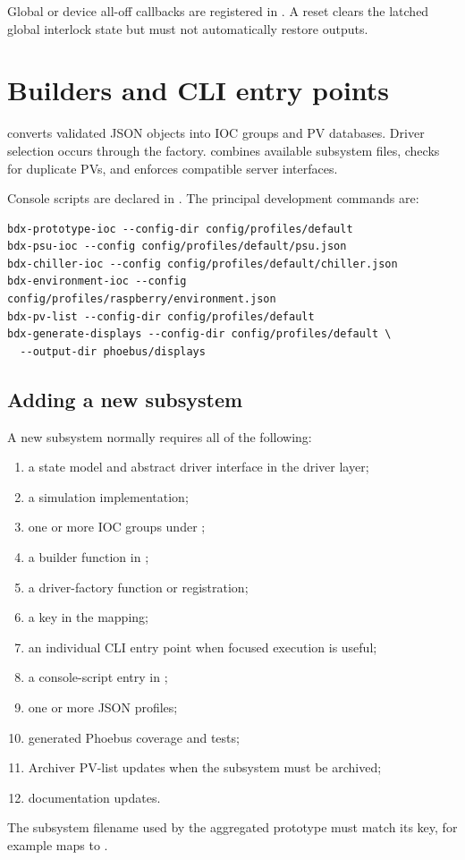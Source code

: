 Global or device all-off callbacks are registered in . A reset clears the latched global interlock state but must not automatically restore outputs.

\section{Builders and CLI entry points}

 converts validated JSON objects into IOC groups and PV databases. Driver selection occurs through the factory.  combines available subsystem files, checks for duplicate PVs, and enforces compatible server interfaces.

Console scripts are declared in . The principal development commands are:

\begin{lstlisting}[style=shell]
bdx-prototype-ioc --config-dir config/profiles/default
bdx-psu-ioc --config config/profiles/default/psu.json
bdx-chiller-ioc --config config/profiles/default/chiller.json
bdx-environment-ioc --config config/profiles/raspberry/environment.json
bdx-pv-list --config-dir config/profiles/default
bdx-generate-displays --config-dir config/profiles/default \
  --output-dir phoebus/displays
\end{lstlisting}

\subsection{Adding a new subsystem}

A new subsystem normally requires all of the following:

\begin{enumerate}
  \item a state model and abstract driver interface in the driver layer;
  \item a simulation implementation;
  \item one or more IOC groups under ;
  \item a builder function in \file{builders.py};
  \item a driver-factory function or registration;
  \item a key in the  mapping;
  \item an individual CLI entry point when focused execution is useful;
  \item a console-script entry in \file{pyproject.toml};
  \item one or more JSON profiles;
  \item generated Phoebus coverage and tests;
  \item Archiver PV-list updates when the subsystem must be archived;
  \item documentation updates.
\end{enumerate}

The subsystem filename used by the aggregated prototype must match its  key, for example  maps to .
